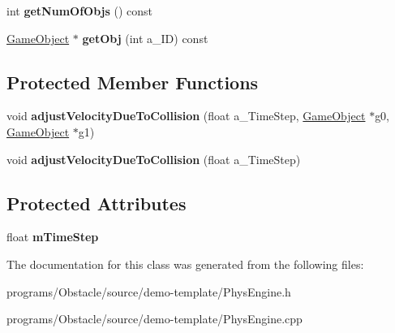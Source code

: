 \begin{DoxyCompactItemize}
\item 
int {\bfseries get\+Num\+Of\+Objs} () const \hypertarget{classns__phys_1_1_phys_engine_a3e00b905705484efeca95c5d7d866484}{}\label{classns__phys_1_1_phys_engine_a3e00b905705484efeca95c5d7d866484}

\item 
\hyperlink{classns__phys_1_1_game_object}{Game\+Object} $\ast$ {\bfseries get\+Obj} (int a\+\_\+\+ID) const \hypertarget{classns__phys_1_1_phys_engine_a1bed61dc28373090427514b1e9e43dca}{}\label{classns__phys_1_1_phys_engine_a1bed61dc28373090427514b1e9e43dca}

\end{DoxyCompactItemize}
\subsection*{Protected Member Functions}
\begin{DoxyCompactItemize}
\item 
void {\bfseries adjust\+Velocity\+Due\+To\+Collision} (float a\+\_\+\+Time\+Step, \hyperlink{classns__phys_1_1_game_object}{Game\+Object} $\ast$g0, \hyperlink{classns__phys_1_1_game_object}{Game\+Object} $\ast$g1)\hypertarget{classns__phys_1_1_phys_engine_a16152ec477d63f292b7015f291b652ea}{}\label{classns__phys_1_1_phys_engine_a16152ec477d63f292b7015f291b652ea}

\item 
void {\bfseries adjust\+Velocity\+Due\+To\+Collision} (float a\+\_\+\+Time\+Step)\hypertarget{classns__phys_1_1_phys_engine_aeeec03c16168db6ec3ce7e55675f0154}{}\label{classns__phys_1_1_phys_engine_aeeec03c16168db6ec3ce7e55675f0154}

\end{DoxyCompactItemize}
\subsection*{Protected Attributes}
\begin{DoxyCompactItemize}
\item 
float {\bfseries m\+Time\+Step}\hypertarget{classns__phys_1_1_phys_engine_abaef8cc48384793a00200c4f11adbddd}{}\label{classns__phys_1_1_phys_engine_abaef8cc48384793a00200c4f11adbddd}

\end{DoxyCompactItemize}


The documentation for this class was generated from the following files\+:\begin{DoxyCompactItemize}
\item 
programs/\+Obstacle/source/demo-\/template/Phys\+Engine.\+h\item 
programs/\+Obstacle/source/demo-\/template/Phys\+Engine.\+cpp\end{DoxyCompactItemize}
